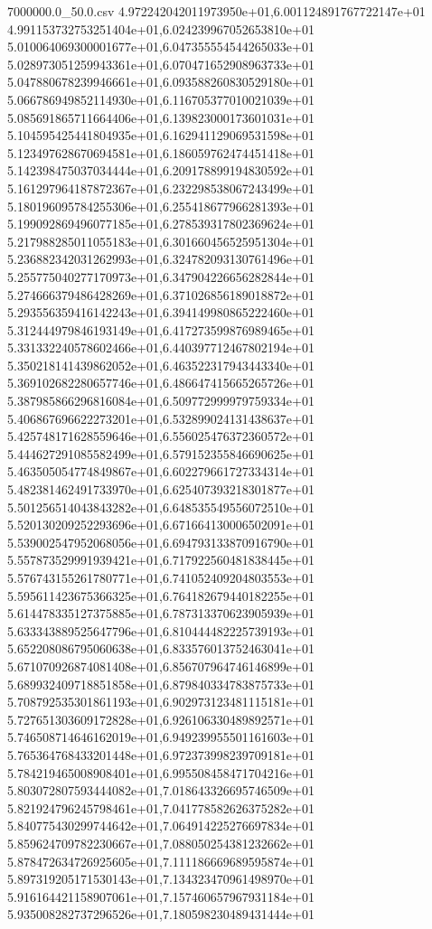 \begin{filecontents*}{7000000.0_50.0.csv}
4.972242042011973950e+01,6.001124891767722147e+01
4.991153732753251404e+01,6.024239967052653810e+01
5.010064069300001677e+01,6.047355554544265033e+01
5.028973051259943361e+01,6.070471652908963733e+01
5.047880678239946661e+01,6.093588260830529180e+01
5.066786949852114930e+01,6.116705377010021039e+01
5.085691865711664406e+01,6.139823000173601031e+01
5.104595425441804935e+01,6.162941129069531598e+01
5.123497628670694581e+01,6.186059762474451418e+01
5.142398475037034444e+01,6.209178899194830592e+01
5.161297964187872367e+01,6.232298538067243499e+01
5.180196095784255306e+01,6.255418677966281393e+01
5.199092869496077185e+01,6.278539317802369624e+01
5.217988285011055183e+01,6.301660456525951304e+01
5.236882342031262993e+01,6.324782093130761496e+01
5.255775040277170973e+01,6.347904226656282844e+01
5.274666379486428269e+01,6.371026856189018872e+01
5.293556359416142243e+01,6.394149980865222460e+01
5.312444979846193149e+01,6.417273599876989465e+01
5.331332240578602466e+01,6.440397712467802194e+01
5.350218141439862052e+01,6.463522317943443340e+01
5.369102682280657746e+01,6.486647415665265726e+01
5.387985866296816084e+01,6.509772999979759334e+01
5.406867696622273201e+01,6.532899024131438637e+01
5.425748171628559646e+01,6.556025476372360572e+01
5.444627291085582499e+01,6.579152355846690625e+01
5.463505054774849867e+01,6.602279661727334314e+01
5.482381462491733970e+01,6.625407393218301877e+01
5.501256514043843282e+01,6.648535549556072510e+01
5.520130209252293696e+01,6.671664130006502091e+01
5.539002547952068056e+01,6.694793133870916790e+01
5.557873529991939421e+01,6.717922560481838445e+01
5.576743155261780771e+01,6.741052409204803553e+01
5.595611423675366325e+01,6.764182679440182255e+01
5.614478335127375885e+01,6.787313370623905939e+01
5.633343889525647796e+01,6.810444482225739193e+01
5.652208086795060638e+01,6.833576013752463041e+01
5.671070926874081408e+01,6.856707964746146899e+01
5.689932409718851858e+01,6.879840334783875733e+01
5.708792535301861193e+01,6.902973123481115181e+01
5.727651303609172828e+01,6.926106330489892571e+01
5.746508714646162019e+01,6.949239955501161603e+01
5.765364768433201448e+01,6.972373998239709181e+01
5.784219465008908401e+01,6.995508458471704216e+01
5.803072807593444082e+01,7.018643326695746509e+01
5.821924796245798461e+01,7.041778582626375282e+01
5.840775430299744642e+01,7.064914225276697834e+01
5.859624709782230667e+01,7.088050254381232662e+01
5.878472634726925605e+01,7.111186669689595874e+01
5.897319205171530143e+01,7.134323470961498970e+01
5.916164421158907061e+01,7.157460657967931184e+01
5.935008282737296526e+01,7.180598230489431444e+01

\end{filecontents*}
